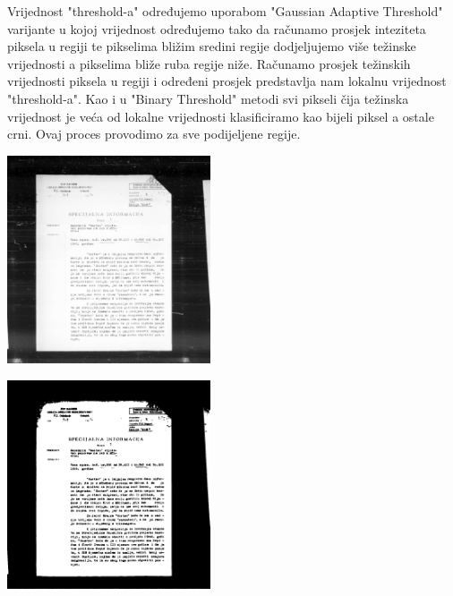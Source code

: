 \documentclass[times, utf8, zavrsni, numeric]{fer}
\begin{document}
Vrijednost "threshold-a" određujemo uporabom "Gaussian Adaptive Threshold" varijante u kojoj vrijednost određujemo tako da računamo prosjek inteziteta piksela u regiji te pikselima bližim sredini regije dodjeljujemo više težinske vrijednosti a pikselima bliže ruba regije niže. Računamo prosjek težinskih vrijednosti piksela u regiji i određeni prosjek predstavlja nam lokalnu vrijednost "threshold-a". Kao i u "Binary Threshold" metodi svi pikseli čija težinska vrijednost je veća od lokalne vrijednosti klasificiramo kao bijeli piksel a ostale crni. Ovaj proces provodimo za sve podijeljene regije.
\pagebreak
\begin{center}
\begin{minipage}{0.48\linewidth}
\includegraphics[width=6cm]{images/thresh/Z05353422.jpg}
\end{minipage}%
\hfill
\begin{minipage}{0.49\linewidth}
\includegraphics[width=6cm]{images/thresh/Z05353422_thresh.jpg}
\end{minipage}
\end{center}
\end{document}
